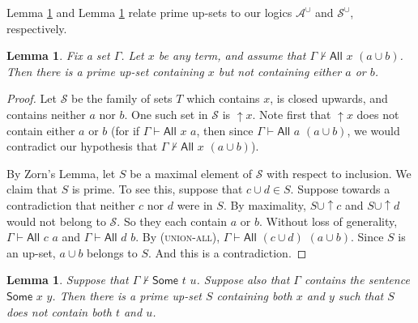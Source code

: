 \documentclass[letterpaper]{article} %
\newtheorem{lemma}[theorem]{Lemma}
\theoremstyle{definition}
\renewcommand{\SS}{\mathcal{S}}
\newcommand{\proves}{\vdash}
\newcommand{\Aunion}{\mathscr{A}^{\cup}}
\newcommand{\Sunion}{\mathscr{S}^{\cup}}
\newcommand{\proverule}{\textsc}
\newcommand{\unionall}{\proverule{union-all}}
\newcommand{\All}[2]{\mathsf{All}\,\,#1\,\,#2}
\newcommand{\Some}[2]{\mathsf{Some}\,\,#1\,\,#2}
\begin{document}
Lemma \ref{lemma-zorn} and Lemma \ref{lemma-some-prime-upset} relate prime up-sets to our logics $\Aunion$ and $\Sunion$, respectively.

\begin{lemma}  Fix a set $\Gamma$.
Let $x$ be any term, and assume that $\Gamma \not\proves \All{x}{(a \cup b)}$.
Then there is a prime up-set containing $x$ but not containing either $a$ or $b$.
\label{lemma-zorn}
\end{lemma}

\begin{proof}
Let $\SS$ be the family of sets $T$ which contains $x$, is closed upwards, and contains neither  $a$ nor $b$.
One such set in $\SS$ is $\uparrow x$.  Note first that $\uparrow x$ does not contain either $a$ or $b$ (for if $\Gamma \proves \All{x}{a}$, then since $\Gamma \proves \All{a}{(a \cup b)}$, we would contradict our hypothesis that $\Gamma \not \proves \All{x}{(a \cup b)}$).

By Zorn's Lemma, let $S$ be a maximal element of $\SS$ with respect to inclusion.
We claim that 
$S$ is  prime.   To see this, suppose that $c \cup d\in S$.  Suppose towards a contradiction that neither $c$ nor $d$ were in $S$.
By maximality, $S\cup\uparrow c$ and $S\cup\uparrow d$  would not belong to $\SS$. 
So they each contain $a$ or $b$.   Without loss of generality, $\Gamma \proves \All{c}{a}$ and $\Gamma \proves \All{d}{b}$.  
By (\unionall), $\Gamma \proves \All{(c \cup d)}{(a \cup b)}$.  Since $S$ is an up-set, $a \cup b$ belongs to $S$.  And this is a contradiction.
\end{proof}

\begin{lemma}
 Suppose that $\Gamma\not\proves \Some{t}{u}$.
 Suppose also that $\Gamma$ contains the sentence $\Some{x}{y}$.
 Then there is a prime up-set $S$ containing both $x$ and $y$ such that
 $S$
 does not contain both $t$ and $u$.
 \label{lemma-some-prime-upset}
 \end{lemma}
 
\end{document}

